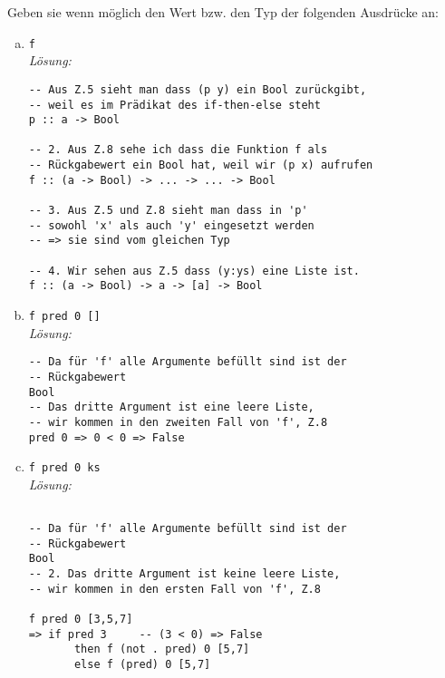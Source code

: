 \documentclass{article}
\begin{document}
Geben sie wenn möglich den Wert bzw. den Typ der folgenden Ausdrücke an:

\newpage

\begin{enumerate} [a)]
    \setlength\itemsep{3em}
    \item \texttt{f} \\[2mm]
    \textit{Lösung:}
    \begin{mdframed}[backgroundcolor=bg]
        \begin{verbatim}
-- Aus Z.5 sieht man dass (p y) ein Bool zurückgibt,
-- weil es im Prädikat des if-then-else steht
p :: a -> Bool

-- 2. Aus Z.8 sehe ich dass die Funktion f als
-- Rückgabewert ein Bool hat, weil wir (p x) aufrufen
f :: (a -> Bool) -> ... -> ... -> Bool

-- 3. Aus Z.5 und Z.8 sieht man dass in 'p' 
-- sowohl 'x' als auch 'y' eingesetzt werden
-- => sie sind vom gleichen Typ

-- 4. Wir sehen aus Z.5 dass (y:ys) eine Liste ist.
f :: (a -> Bool) -> a -> [a] -> Bool
        \end{verbatim}
    \end{mdframed}
    \item \texttt{f pred 0 []} \\[2mm]
    \textit{Lösung:}
    \begin{mdframed}[backgroundcolor=bg]
        \begin{verbatim}
-- Da für 'f' alle Argumente befüllt sind ist der
-- Rückgabewert
Bool
-- Das dritte Argument ist eine leere Liste,
-- wir kommen in den zweiten Fall von 'f', Z.8
pred 0 => 0 < 0 => False
        \end{verbatim}
    \end{mdframed}

\newpage

    \item \texttt{f pred 0 ks} \\[2mm]
    \textit{Lösung:}
    \begin{mdframed}[backgroundcolor=bg]
        \begin{verbatim}

-- Da für 'f' alle Argumente befüllt sind ist der
-- Rückgabewert
Bool
-- 2. Das dritte Argument ist keine leere Liste,
-- wir kommen in den ersten Fall von 'f', Z.8

f pred 0 [3,5,7]
=> if pred 3     -- (3 < 0) => False
       then f (not . pred) 0 [5,7]
       else f (pred) 0 [5,7]


\end{verbatim}
\end{mdframed}
\end{enumerate}
\end{document}
